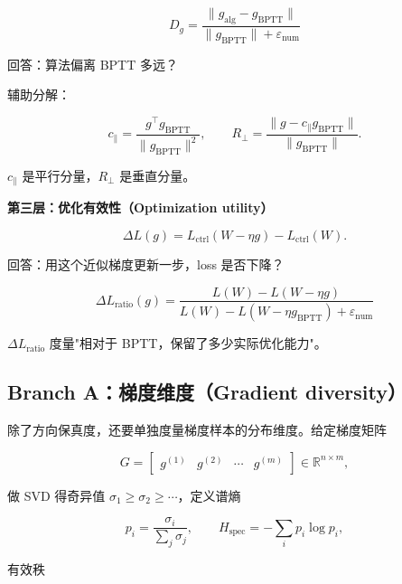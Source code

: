 \documentclass[journal,12pt,onecolumn]{IEEEtran}
\begin{document}
\begin{equation}
D_g=\frac{\|g_{\mathrm{alg}}-g_{\mathrm{BPTT}}\|}{\|g_{\mathrm{BPTT}}\|+\varepsilon_{\mathrm{num}}}
\end{equation}

回答：算法偏离 BPTT 多远？

辅助分解：

\begin{equation}
c_\parallel=\frac{g^\top g_{\mathrm{BPTT}}}{\|g_{\mathrm{BPTT}}\|^2},
\qquad
R_\perp=\frac{\|g-c_\parallel g_{\mathrm{BPTT}}\|}{\|g_{\mathrm{BPTT}}\|}.
\end{equation}

$c_\parallel$ 是平行分量，$R_\perp$ 是垂直分量。

\textbf{第三层：优化有效性（Optimization utility）}

\begin{equation}
\Delta L(g)=L_{\mathrm{ctrl}}(W-\eta g)-L_{\mathrm{ctrl}}(W).
\end{equation}

回答：用这个近似梯度更新一步，loss 是否下降？

\begin{equation}
\Delta L_{\mathrm{ratio}}(g)=\frac{L(W)-L(W-\eta g)}{L(W)-L(W-\eta g_{\mathrm{BPTT}})+\varepsilon_{\mathrm{num}}}
\end{equation}

$\Delta L_{\mathrm{ratio}}$ 度量"相对于 BPTT，保留了多少实际优化能力"。

\subsection{Branch A：梯度维度（Gradient diversity）}

除了方向保真度，还要单独度量梯度样本的分布维度。给定梯度矩阵

\begin{equation}
G=\begin{bmatrix}g^{(1)} & g^{(2)} & \cdots & g^{(m)}\end{bmatrix}\in\mathbb R^{n\times m},
\end{equation}

做 SVD 得奇异值 $\sigma_1\ge\sigma_2\ge\cdots$，定义谱熵

\begin{equation}
p_i=\frac{\sigma_i}{\sum_j\sigma_j},
\qquad
H_{\mathrm{spec}}=-\sum_i p_i\log p_i,
\end{equation}

有效秩
\end{document}
